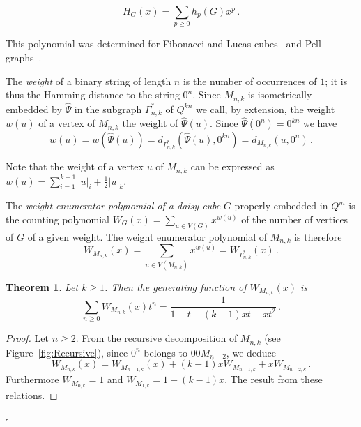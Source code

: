 \documentclass[11pt]{article}
\newtheorem{theorem}{\bf Theorem}[section]
\newcommand{\qed}{\hfill $\square$ \bigskip}
\begin{document}
$$H_{G}(x) = \sum_{p\geq 0} h_p(G) x^p\,.$$

This polynomial was determined for Fibonacci and Lucas cubes~\cite{M-2012a} and Pell graphs~\cite{EKM-2023}.

The \emph{weight} of a binary string of length $n$ is the number of occurrences of  $1$; it is thus the Hamming distance to the string $0^n$. Since $M_{n,k}$ is isometrically embedded by $\widehat{\Psi}$ in  the  subgraph $\Gamma_{n,k}^*$ of $Q^{kn}$ we call, by extension, the weight $w(u)$ of a vertex of $M_{n,k}$ the weight of $\widehat{\Psi}(u)$. Since $\widehat{\Psi}(0^n)=0^{kn}$ we have
$$w(u)=w(\widehat{\Psi}(u))=d_{\Gamma_{n,k}^*}(\widehat{\Psi}(u),0^{kn})=d_{M_{n,k}}(u,0^n)\,.$$

Note that the weight of a vertex $u$ of $M_{n,k}$ can be expressed as $w(u)=\sum_{i=1}^{k-1}{|u|_i}+\frac{1}{2}|u|_{k}$.

The \emph{weight enumerator polynomial of a daisy cube} $G$ properly embedded in $Q^m$ is the counting polynomial $W_{G}(x)=\sum_{u\in V(G)}{x^{w(u)}}$ of the number of vertices of $G$ of a given weight. The weight enumerator polynomial of ${M_{n,k}}$ is therefore  
$$W_{M_{n,k}}(x)=\sum_{u\in V(M_{n,k})}{x^{w(u)}}=W_{\Gamma_{n,k}^*}(x)\,.$$

\begin{theorem}\label{th:geneW}
Let $k\geq1$. Then the generating function of $ W_{M_{n,k}}(x)$ is 
$$ \sum_{n\geq0}{ W_{M_{n,k}}(x)t^n}=\frac{1}{1-t-(k-1)x t -xt^2}\,.$$
\end{theorem}
\begin{proof}
Let $n\geq 2$. From the recursive decomposition of $M_{n,k}$ (see Figure~\ref{fig:Recursive}), since $0^n$ belongs to $00M_{n-2}$, we deduce 
$$  W_{M_{n,k}}(x)=W_{M_{n-1,k}}(x)+(k-1) x W_{M_{n-1,k}}+x W_{M_{n-2,k}} \,.$$
Furthermore $W_{M_{0,k}}=1$ and  $W_{M_{1,k}}=1+(k-1)x$. The result from these relations.
\end{proof}
\qed
\end{document}
